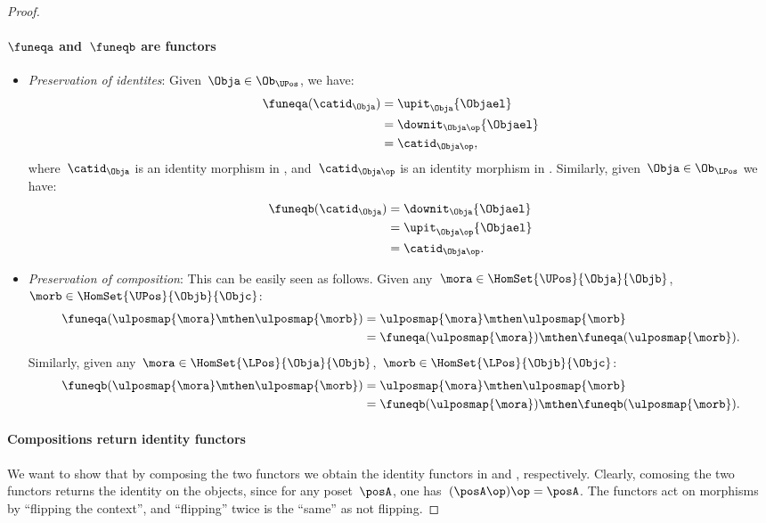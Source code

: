 \begin{proof}
\paragraph*{$\funeqa$ and~$\funeqb$ are functors}
\begin{itemize}
    \item \emph{Preservation of identites}: Given~$\Obja\in \Ob_{\UPos}$, we have:
    \begin{equation*}
        \begin{aligned}
            \funeqa(\catid_\Obja)&=\upit_\Obja\{\Objael\}\\
            &=\downit_{\Obja\op}\{\Objael\}\\
            &=\catid_{\Obja\op},
        \end{aligned}
    \end{equation*}
where~$\catid_\Obja$ is an identity morphism in \UPos, and~$\catid_{\Obja\op}$ is an identity morphism in \LPos. Similarly, given~$\Obja\in \Ob_{\LPos}$ we have:
\begin{equation*}
    \begin{aligned}
    \funeqb(\catid_\Obja)&=\downit_\Obja\{\Objael\}\\
    &=\upit_{\Obja\op}\{\Objael\}\\
    &=\catid_{\Obja\op}.
    \end{aligned}
\end{equation*}
\item \emph{Preservation of composition}: This can be easily seen as follows. Given any~$\mora\in \HomSet{\UPos}{\Obja}{\Objb}$,~$\morb\in \HomSet{\UPos}{\Objb}{\Objc}$:
\begin{equation*}
    \begin{aligned}
    \funeqa(\ulposmap{\mora} \mthen \ulposmap{\morb})&=\ulposmap{\mora} \mthen \ulposmap{\morb}\\
    &=\funeqa(\ulposmap{\mora})\mthen \funeqa(\ulposmap{\morb}).
    \end{aligned}
\end{equation*}
Similarly, given any~$\mora\in \HomSet{\LPos}{\Obja}{\Objb}$,~$\morb\in \HomSet{\LPos}{\Objb}{\Objc}$:
\begin{equation*}
    \begin{aligned}
    \funeqb(\ulposmap{\mora} \mthen \ulposmap{\morb})&=\ulposmap{\mora} \mthen\ulposmap{\morb}\\
    &=\funeqb(\ulposmap{\mora})\mthen \funeqb(\ulposmap{\morb}).
    \end{aligned}
\end{equation*}
\end{itemize}
\paragraph*{Compositions return identity functors}
We want to show that by composing the two functors we obtain the identity functors in \UPos and \LPos, respectively. Clearly, comosing the two functors returns the identity on the objects, since for any poset~$\posA$, one has~$(\posA\op)\op=\posA$. The functors act on morphisms by ``flipping the context'', and ``flipping'' twice is the ``same'' as not flipping.
\end{proof}

